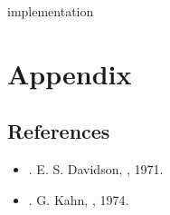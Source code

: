 \documentclass[letterpaper,10pt,english]{sphinxmanual}
\begin{document}
\begin{sphinxuseclass}{implementation}\label{\detokenize{core/core:source-3}}
\begingroup\def\sphinxbelowcaptionspace{0pt}
\def\sphinxLiteralBlockLabel{\label{\detokenize{core/core:file-build/model/core/ref.c}}}
\begin{sphinxVerbatim}[commandchars=\\\{\}]
\end{sphinxVerbatim}

\endgroup

\end{sphinxuseclass}
\part*{Appendix}

\sphinxstepscope


\chapter{References}
\label{\detokenize{refs/refs:references}}\label{\detokenize{refs/refs::doc}}\begin{itemize}
\item {} 
\sphinxAtStartPar
{}. E. S. Davidson, , 1971.

\item {} 
\sphinxAtStartPar
{}. G. Kahn, , 1974.

\end{itemize}
\end{document}
